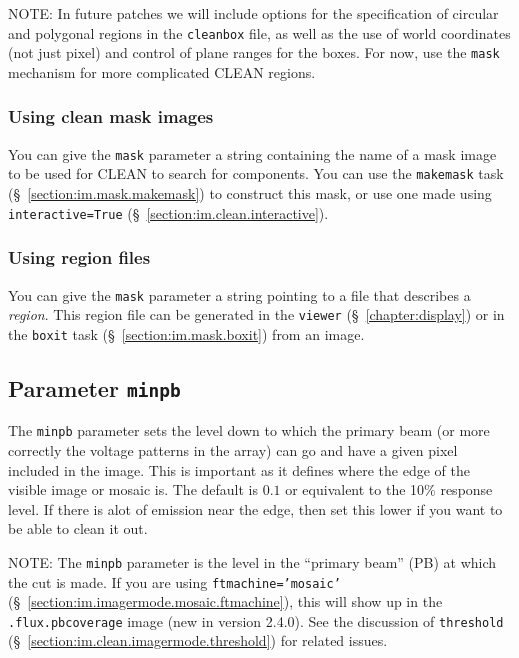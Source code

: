 NOTE: In future patches we will include options for the specification
of circular and polygonal regions in the {\tt cleanbox} file, as
well as the use of world coordinates (not just pixel) and control
of plane ranges for the boxes.  For now, use the {\tt mask} mechanism
for more complicated CLEAN regions.

\subsubsection{Using clean mask images}
\label{section:im.clean.mask.maskimage}

You can give the {\tt mask} parameter a string containing the
name of a mask image to be used for CLEAN to search for components.  
You can use the {\tt makemask} task
(\S~\ref{section:im.mask.makemask}) to construct this mask, or use 
one made using {\tt interactive=True}
(\S~\ref{section:im.clean.interactive}).

\subsubsection{Using region files}
\label{section:im.clean.mask.regions}

You can give the {\tt mask} parameter a string pointing to a file
that describes a {\it region}.  This region file can be generated
in the {\tt viewer} (\S~\ref{chapter:display}) or in the {\tt boxit}
task (\S~\ref{section:im.mask.boxit}) from an image.

\subsection{Parameter {\tt minpb} }
\label{section:im.clean.minpb}

The {\tt minpb} parameter sets the level down to which the primary
beam (or more correctly the voltage patterns in the array) can go and
have a given pixel included in the image.  This is important as it
defines where the edge of the visible image or mosaic is. 
The default is $0.1$ or
equivalent to the 10\% response level.  If there is alot of emission
near the edge, then set this lower if you want to be
able to clean it out.

NOTE: The {\tt minpb} parameter is the level in the ``primary beam''
(PB) at which the cut is made.  If you are using {\tt ftmachine='mosaic'}
(\S~\ref{section:im.imagermode.mosaic.ftmachine}), this will show
up in the {\tt .flux.pbcoverage} image (new in version 2.4.0).
See the discussion of {\tt threshold} 
(\S~\ref{section:im.clean.imagermode.threshold}) for related issues.

